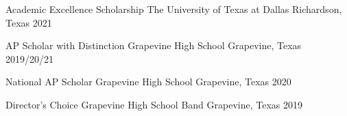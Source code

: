 
\begin{cvhonors}

    \cvhonor
	{Academic Excellence Scholarship}
	{The University of Texas at Dallas}
	{Richardson, Texas}
	{2021}

    \cvhonor
        {AP Scholar with Distinction} %
        {Grapevine High School} %
        {Grapevine, Texas} %
        {2019/20/21} %

    \cvhonor
        {National AP Scholar}
        {Grapevine High School}
        {Grapevine, Texas}
        {2020}

    \cvhonor 
	{Director's Choice} 
	{Grapevine High School Band} 
	{Grapevine, Texas} 
	{2019}


\end{cvhonors}
